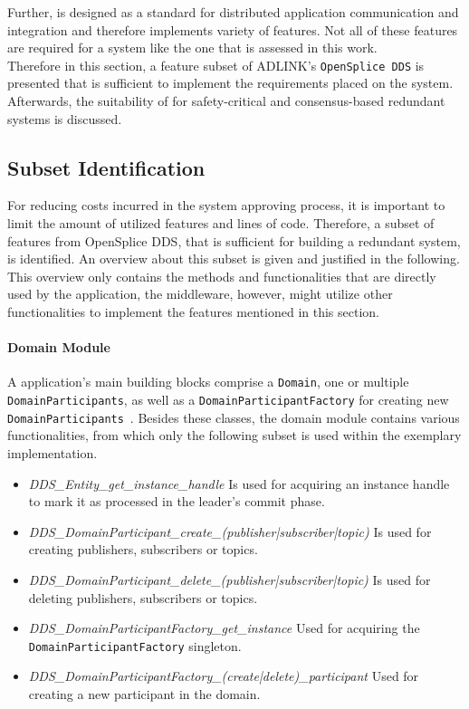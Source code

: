 Further,  is designed as a standard for distributed application communication and integration and therefore implements variety of features.
Not all of these features are required for a system like the one that is assessed in this work.
\\

Therefore in this section, a feature subset of ADLINK's \texttt{OpenSplice DDS} is presented that is sufficient to implement the requirements placed on the system.
Afterwards, the suitability of  for safety-critical and consensus-based redundant systems is discussed.
\subsection{ Subset Identification}

For reducing costs incurred in the system approving process, it is important to limit the amount of utilized features and lines of code.
Therefore, a subset of  features from OpenSplice DDS, that is sufficient for building a redundant system, is identified.
An overview about this subset is given and justified in the following.
This overview only contains the methods and functionalities that are directly used by the application, the middleware, however, might utilize other functionalities to implement the features mentioned in this section.

\paragraph{Domain Module}
A  application's main building blocks comprise a \texttt{Domain}, one or multiple \texttt{DomainParticipants}, as well as a \texttt{DomainParticipantFactory} for creating new \texttt{DomainParticipants}~\cite{omgDDSspec}.
Besides these classes, the domain module contains various functionalities, from which only the following subset is used within the exemplary implementation.

\begin{itemize}
\item \textit{DDS\_Entity\_get\_instance\_handle} Is used for acquiring an instance handle to mark it as processed in the leader's commit phase.
\item \textit{DDS\_DomainParticipant\_create\_(publisher|subscriber|topic)} Is used for creating  publishers, subscribers or topics.
\item \textit{DDS\_DomainParticipant\_delete\_(publisher|subscriber|topic)} Is used for deleting  publishers, subscribers or topics.
\item \textit{DDS\_DomainParticipantFactory\_get\_instance} Used for acquiring the \texttt{DomainParticipantFactory} singleton.
\item \textit{DDS\_DomainParticipantFactory\_(create|delete)\_participant} Used for creating a new participant in the  domain.
\end{itemize}

